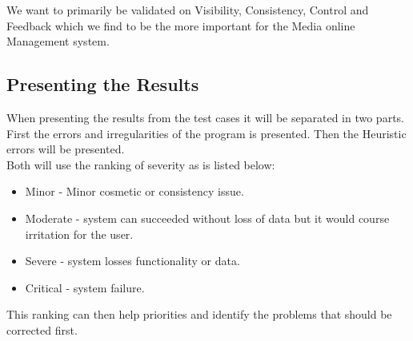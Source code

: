 We want to primarily be validated on Visibility, Consistency, Control and Feedback which we find to be the more important for the Media online Management system.

\subsection{Presenting the Results}
When presenting the results from the test cases it will be separated in two parts. First the errors and irregularities of the program is presented. Then the Heuristic errors will be presented.\\
Both will use the ranking of severity as is listed below:

\begin{itemize}
    \item Minor - Minor cosmetic or consistency issue.
    \item Moderate - system can succeeded without loss of data but it would course irritation for the user. 
		\item Severe - system losses functionality or data.
    \item Critical - system failure.
\end{itemize}

This ranking can then help priorities and identify the problems that should be corrected first.

